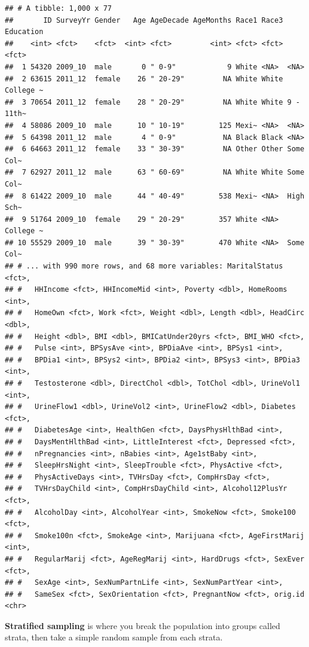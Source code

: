\documentclass[]{book}
\begin{document}
\begin{verbatim}
## # A tibble: 1,000 x 77
##       ID SurveyYr Gender   Age AgeDecade AgeMonths Race1 Race3 Education
##    <int> <fct>    <fct>  <int> <fct>         <int> <fct> <fct> <fct>    
##  1 54320 2009_10  male       0 " 0-9"            9 White <NA>  <NA>     
##  2 63615 2011_12  female    26 " 20-29"         NA White White College ~
##  3 70654 2011_12  female    28 " 20-29"         NA White White 9 - 11th~
##  4 58086 2009_10  male      10 " 10-19"        125 Mexi~ <NA>  <NA>     
##  5 64398 2011_12  male       4 " 0-9"           NA Black Black <NA>     
##  6 64663 2011_12  female    33 " 30-39"         NA Other Other Some Col~
##  7 62927 2011_12  male      63 " 60-69"         NA White White Some Col~
##  8 61422 2009_10  male      44 " 40-49"        538 Mexi~ <NA>  High Sch~
##  9 51764 2009_10  female    29 " 20-29"        357 White <NA>  College ~
## 10 55529 2009_10  male      39 " 30-39"        470 White <NA>  Some Col~
## # ... with 990 more rows, and 68 more variables: MaritalStatus <fct>,
## #   HHIncome <fct>, HHIncomeMid <int>, Poverty <dbl>, HomeRooms <int>,
## #   HomeOwn <fct>, Work <fct>, Weight <dbl>, Length <dbl>, HeadCirc <dbl>,
## #   Height <dbl>, BMI <dbl>, BMICatUnder20yrs <fct>, BMI_WHO <fct>,
## #   Pulse <int>, BPSysAve <int>, BPDiaAve <int>, BPSys1 <int>,
## #   BPDia1 <int>, BPSys2 <int>, BPDia2 <int>, BPSys3 <int>, BPDia3 <int>,
## #   Testosterone <dbl>, DirectChol <dbl>, TotChol <dbl>, UrineVol1 <int>,
## #   UrineFlow1 <dbl>, UrineVol2 <int>, UrineFlow2 <dbl>, Diabetes <fct>,
## #   DiabetesAge <int>, HealthGen <fct>, DaysPhysHlthBad <int>,
## #   DaysMentHlthBad <int>, LittleInterest <fct>, Depressed <fct>,
## #   nPregnancies <int>, nBabies <int>, Age1stBaby <int>,
## #   SleepHrsNight <int>, SleepTrouble <fct>, PhysActive <fct>,
## #   PhysActiveDays <int>, TVHrsDay <fct>, CompHrsDay <fct>,
## #   TVHrsDayChild <int>, CompHrsDayChild <int>, Alcohol12PlusYr <fct>,
## #   AlcoholDay <int>, AlcoholYear <int>, SmokeNow <fct>, Smoke100 <fct>,
## #   Smoke100n <fct>, SmokeAge <int>, Marijuana <fct>, AgeFirstMarij <int>,
## #   RegularMarij <fct>, AgeRegMarij <int>, HardDrugs <fct>, SexEver <fct>,
## #   SexAge <int>, SexNumPartnLife <int>, SexNumPartYear <int>,
## #   SameSex <fct>, SexOrientation <fct>, PregnantNow <fct>, orig.id <chr>
\end{verbatim}

\textbf{Stratified sampling} is where you break the population into groups
called strata, then take a simple random sample from each strata.
\end{document}
